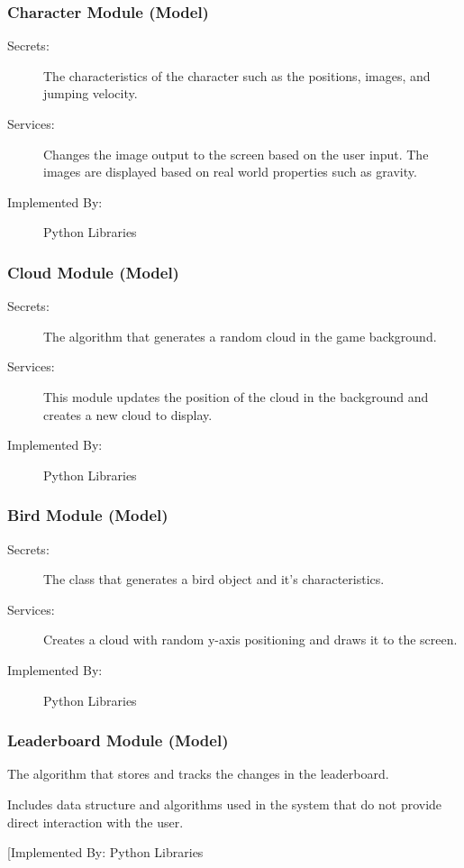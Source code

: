 \documentclass[12pt, titlepage]{article}
\begin{document}
\subsubsection{Character Module (Model)}
\begin{description}
\item[Secrets:] The characteristics of the character such as the positions, images, and jumping velocity. 
\item[Services:] Changes the image output to the screen based on the user input. The images are displayed based on real world properties such as gravity. 
\item[Implemented By:] Python Libraries
\end{description}


\subsubsection{Cloud Module (Model)}
\begin{description}
\item[Secrets:] The algorithm that generates a random cloud in the game background.
\item[Services:] This module updates the position of the cloud in the background and creates a new cloud to display. 
\item[Implemented By:] Python Libraries
\end{description}



\subsubsection{Bird Module (Model)}
\begin{description}
\item[Secrets:] The class that generates a bird object and it's characteristics. 
\item[Services:] Creates a cloud with random y-axis positioning and draws it to the screen. 
\item[Implemented By:] Python Libraries
\end{description}



\subsubsection{Leaderboard Module (Model)}
\begin{description}
\item[Secrets:] The algorithm that stores and tracks the changes in the leaderboard.
\item[Services:] Includes data structure and algorithms used in the system that do not provide direct interaction with the user. 
\item[Implemented By: Python Libraries
\end{description}
\end{document}

